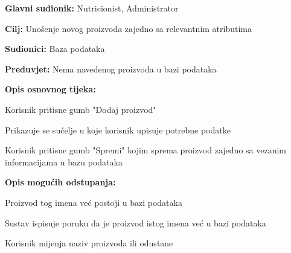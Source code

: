                     \noindent {}
                    \begin{packed_item}
    
                        \item \textbf{Glavni sudionik: }Nutricionist, Administrator
                        \item  \textbf{Cilj:} Unošenje novog proizvoda zajedno sa relevantnim atributima
                        \item  \textbf{Sudionici:} Baza podataka
                        \item  \textbf{Preduvjet:} Nema navedenog proizvoda u bazi podataka
                        \item  \textbf{Opis osnovnog tijeka:} 
                        
                        \item[] \begin{packed_enum}
    
                            \item Korisnik pritisne gumb "Dodaj proizvod"
                            \item Prikazuje se sučelje u koje korisnik upisuje potrebne podatke
                            \item Korisnik pritisne gumb "Spremi" kojim sprema proizvod zajedno sa vezanim informacijama u bazu podataka
                        \end{packed_enum}
                        
                        \item  \textbf{Opis mogućih odstupanja:}
                        
                        \item[] \begin{packed_item}
    
                            \item[2.a] Proizvod tog imena već postoji u bazi podataka
                            \item[] \begin{packed_enum}
                                
                                \item Sustav ispisuje poruku da je proizvod istog imena već u bazi podataka
                                \item Korisnik mijenja naziv proizvoda ili odustane
                                

\end{packed_enum}
\end{packed_item}
\end{packed_item}
